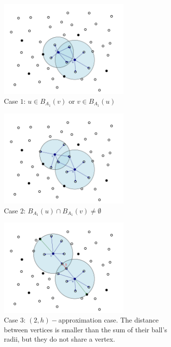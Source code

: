 \documentclass[shortabstract, lic, english]{iithesis}
\theoremstyle{definition} \newtheorem{definition}{Definition}[chapter]
\theoremstyle{plain} \newtheorem{remark}[definition]{Observation}
\theoremstyle{plain} \newtheorem{theorem}[definition]{Theorem}
\theoremstyle{plain} \newtheorem{lemma}[definition]{Lemma}
\theoremstyle{plain} \newtheorem{conjecture}[definition]{Conjecture}
\begin{document}
\begin{figure}[H]
    \centering
    \begin{subfigure}[H]{0.465\textwidth}
        \centering
        \includegraphics[width=6.5cm]{images/case_1}
        \caption{Case $1$: $u \in B_{A_1}(v)$ or $v \in B_{A_1}(u)$}
    \end{subfigure}\hfill%
    \begin{subfigure}[H]{0.465\textwidth}
        \centering
        \includegraphics[width=6.5cm]{images/case_2}
        \caption{Case $2$: $B_{A_1}(u) \cap B_{A_1}(v) \neq \emptyset$}
    \end{subfigure}
    \begin{subfigure}[H]{0.465\textwidth}
        \centering
        \includegraphics[width=6.5cm]{images/case_3_worst}
        \caption{Case $3$: $(2, h)-$approximation case. The distance between vertices is smaller than the sum of their ball's radii, but they do not share a vertex.}
    \end{subfigure}\hfill%
    \begin{subfigure}[H]{0.465\textwidth}

\end{subfigure}
\end{figure}
\end{document}
